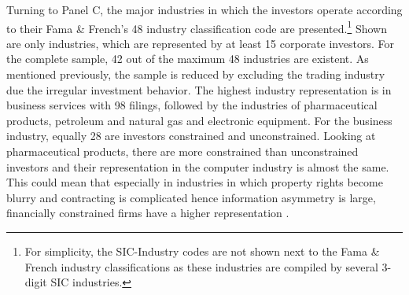 \documentclass[12pt]{article}
\begin{document}
Turning to Panel C, the major industries in which the investors operate according to their Fama \& French's 48 industry classification code are presented.\footnote{For simplicity, the SIC-Industry codes are not shown next to the Fama \& French industry classifications as these industries are compiled by several 3-digit SIC industries.} Shown are only industries, which are represented by at least 15 corporate investors. For the complete sample, 42 out of the maximum 48 industries are existent. As mentioned previously, the sample is reduced by excluding the trading industry due the irregular investment behavior. The highest industry representation is in business services with 98 filings, followed by the industries of pharmaceutical products, petroleum and natural gas and electronic equipment. For the business industry, equally 28 are investors constrained and unconstrained. Looking at pharmaceutical products, there are more constrained than unconstrained investors and their representation in the computer industry is almost the same. This could mean that especially in industries in which property rights become blurry and contracting is complicated hence information asymmetry is large, financially constrained firms have a higher representation \citep[p.4]{Liao2014}.
\end{document}
